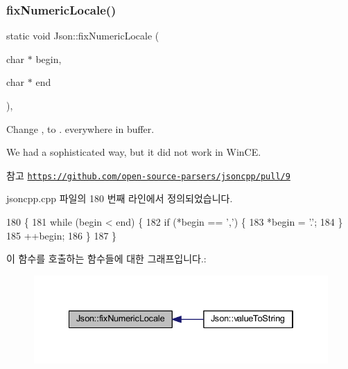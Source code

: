 \subsubsection{\texorpdfstring{fix\+Numeric\+Locale()}{fixNumericLocale()}}
{\footnotesize\ttfamily static void Json\+::fix\+Numeric\+Locale (\begin{DoxyParamCaption}\item[{char $\ast$}]{begin,  }\item[{char $\ast$}]{end }\end{DoxyParamCaption})\hspace{0.3cm}{\ttfamily [inline]}, {\ttfamily [static]}}

Change \textquotesingle{},\textquotesingle{} to \textquotesingle{}.\textquotesingle{} everywhere in buffer.

We had a sophisticated way, but it did not work in Win\+CE. \begin{DoxySeeAlso}{참고}
\href{https://github.com/open-source-parsers/jsoncpp/pull/9}{\tt https\+://github.\+com/open-\/source-\/parsers/jsoncpp/pull/9} 
\end{DoxySeeAlso}


jsoncpp.\+cpp 파일의 180 번째 라인에서 정의되었습니다.


\begin{DoxyCode}
180                                                             \{
181   \textcolor{keywordflow}{while} (begin < end) \{
182     \textcolor{keywordflow}{if} (*begin == \textcolor{charliteral}{','}) \{
183       *begin = \textcolor{charliteral}{'.'};
184     \}
185     ++begin;
186   \}
187 \}
\end{DoxyCode}
이 함수를 호출하는 함수들에 대한 그래프입니다.\+:\nopagebreak
\begin{figure}[H]
\begin{center}
\leavevmode
\includegraphics[width=334pt]{namespace_json_aa208904144dc7b11ccc28f47c9afab9a_icgraph}
\end{center}
\end{figure}
\mbox{\label{namespace_json_ac142c270507391c8d86f35b550d36eb4}} 

